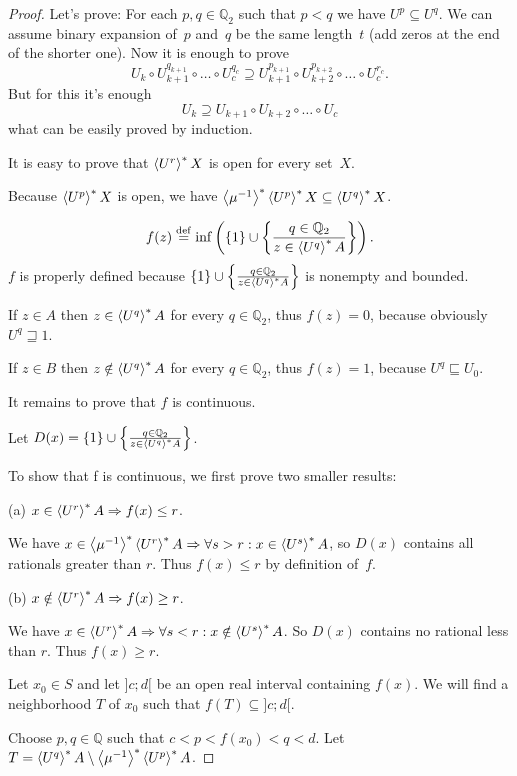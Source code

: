 \begin{proof}
Let's prove: For each $p,q\in\mathbb{Q}_2$ such that $p<q$ we have $U^p\subseteq U^q$.
We can assume binary expansion of~$p$ and~$q$ be the same length~$t$ (add zeros at the end of the shorter one).
Now it is enough to prove
\[ U_k\circ U_{k+1}^{q_{k+1}}\circ\dots\circ U_c^{q_c}\supseteq U_{k+1}^{p_{k+1}}\circ U_{k+2}^{p_{k+2}}\circ\dots\circ U_c^{r_c}. \]
But for this it's enough
\[ U_k\supseteq U_{k+1}\circ U_{k+2}\circ\dots\circ U_c \]
what can be easily proved by induction.

It is easy to prove that $\left\langle U^r\right\rangle ^{\ast}X$ is open for every set~$X$.

Because $\left\langle U^p\right\rangle ^{\ast}X$ is open, we have $\left\langle \mu^{-1}\right\rangle ^{\ast}\left\langle U^p\right\rangle ^{\ast}X\subseteq\left\langle U^q\right\rangle ^{\ast}X$.

\[ f (z) \overset{\mathrm{def}}{=} \inf \left( \{ 1 \} \cup \left\{ \frac{ q \in
   \mathbb{Q}_2 }{ z \in \left\langle U^q\right\rangle ^{\ast}
   A }\right\} \right). \]
$f$ is properly defined because $\{ 1 \} \cup \left\{ \frac{ q \in \mathbb{Q}_2
}{ z \in \left\langle U^q\right\rangle ^{\ast} A }\right\}$ is
nonempty and bounded.

If $z \in A$ then $z \in \left\langle U^q\right\rangle ^{\ast} A$ for every $q \in
\mathbb{Q}_2$, thus $f (z) = 0$, because obviously $U^q \sqsupseteq 1$.

If $z \in B$ then $z \notin \left\langle U^q\right\rangle ^{\ast} A$ for every $q \in
\mathbb{Q}_2$, thus $f (z) = 1$, because $U^q \sqsubseteq U_0$.

It remains to prove that $f$ is continuous.

Let $D (x) = \{ 1 \} \cup \left\{ \frac{ q \in \mathbb{Q}_2 }{
z \in \left\langle U^q\right\rangle ^{\ast} A }\right\}$.

To show that f is continuous, we first prove two smaller results:

(a) $x\in\left\langle U^r\right\rangle ^{\ast}A \Rightarrow f(x)\leq r$.

We have $x\in\left\langle \mu^{-1}\right\rangle ^{\ast}\left\langle U^r\right\rangle ^{\ast}A \Rightarrow \forall s>r:x\in\left\langle U^s\right\rangle ^{\ast}A$,
so $D(x)$ contains all rationals greater than $r$. Thus $f(x)\leq r$ by definition of~$f$.

(b) $x\notin\left\langle U^r\right\rangle ^{\ast}A \Rightarrow f(x)\geq r$.

We have $x\in\left\langle U^r\right\rangle ^{\ast}A \Rightarrow \forall s<r:x\notin\left\langle U^s\right\rangle ^{\ast}A$.
So $D(x)$ contains no rational less than $r$. Thus $f(x)\geq r$.

Let $x_0\in S$ and let $]c;d[$ be an open real interval containing $f(x)$.
We will find a neighborhood $T$ of $x_0$ such that $f(T)\subseteq]c;d[$.

Choose $p,q\in\mathbb{Q}$ such that $c < p < f(x_0) < q < d$. Let $T=\left\langle U^q\right\rangle ^{\ast}A\setminus\left\langle \mu^{-1}\right\rangle ^{\ast}\left\langle U^p\right\rangle ^{\ast}A$.


\end{proof}
